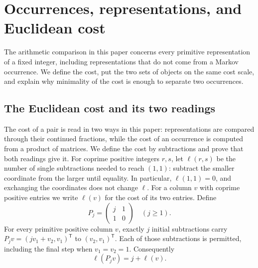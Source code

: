 \section{Occurrences, representations, and Euclidean cost}\label{sec:occurrences}

The arithmetic comparison in this paper concerns every primitive
representation of a fixed integer, including representations that do not
come from a Markov occurrence. We define the cost, put the two sets of
objects on the same cost scale, and explain why minimality of the cost is
enough to separate two occurrences.

\subsection{The Euclidean cost and its two readings}\label{sec:cost}

The cost of a pair is read in two ways in this paper: representations are
compared through their continued fractions, while the cost of an occurrence
is computed from a product of matrices. We define the cost by subtractions
and prove that both readings give it. For coprime positive integers $r,s$,
let $\ell(r,s)$ be the number of single subtractions needed to reach
$(1,1)$: subtract the smaller coordinate from the larger until equality. In particular,
$\ell(1,1)=0$, and exchanging the coordinates does not change $\ell$. For a
column $v$ with coprime positive entries we write $\ell(v)$ for the cost of
its two entries. Define
\begin{equation}\label{eq:continued-fraction-matrices}
 P_j=\begin{pmatrix}j&1\\1&0\end{pmatrix}\quad(j\geqslant1).
\end{equation}
For every primitive positive column $v$, exactly $j$ initial
subtractions carry $P_jv=(jv_1+v_2,v_1)^{\mathsf T}$ to
$(v_2,v_1)^{\mathsf T}$. Each of those subtractions is permitted,
including the final step when $v_1=v_2=1$. Consequently
\begin{equation}\label{eq:digit-adds-cost}
 \ell(P_jv)=j+\ell(v).
\end{equation}

